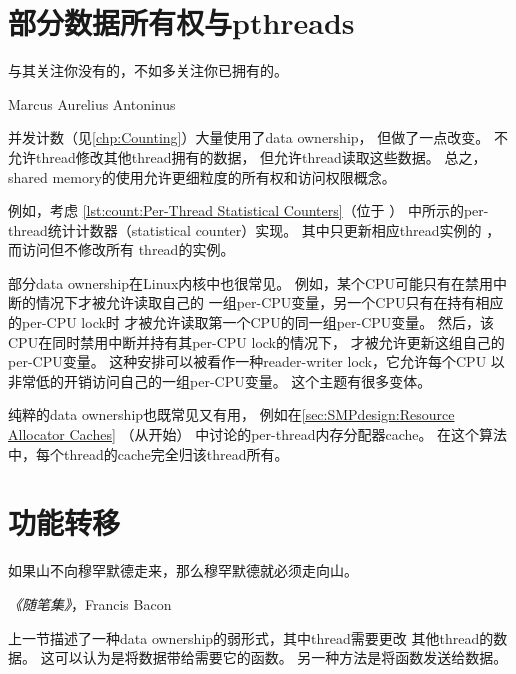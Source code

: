 \section{部分数据所有权与pthreads}
\label{sec:owned:Partial Data Ownership and pthreads}
%
\epigraph{与其关注你没有的，不如多关注你已拥有的。}
	 {Marcus Aurelius Antoninus}

并发计数（见\cref{chp:Counting}）大量使用了data ownership，
但做了一点改变。
不允许thread修改其他thread拥有的数据，
但允许thread读取这些数据。
总之，shared memory的使用允许更细粒度的所有权和访问权限概念。

例如，考虑
\cref{lst:count:Per-Thread Statistical Counters}（位于
）
中所示的per-thread统计计数器（statistical counter）实现。
其中只更新相应thread实例的
，
而访问但不修改所有
thread的实例。

\QuickQuizEnd

部分data ownership在Linux内核中也很常见。
例如，某个CPU可能只有在禁用中断的情况下才被允许读取自己的
一组per-CPU变量，另一个CPU只有在持有相应的per-CPU lock时
才被允许读取第一个CPU的同一组per-CPU变量。
然后，该CPU在同时禁用中断并持有其per-CPU lock的情况下，
才被允许更新这组自己的per-CPU变量。
这种安排可以被看作一种reader-writer lock，它允许每个CPU
以非常低的开销访问自己的一组per-CPU变量。
这个主题有很多变体。

纯粹的data ownership也既常见又有用，
例如在\cref{sec:SMPdesign:Resource Allocator Caches}
（从开始）
中讨论的per-thread内存分配器cache。
在这个算法中，每个thread的cache完全归该thread所有。

\section{功能转移}
\label{sec:owned:Function Shipping}
%
\epigraph{如果山不向穆罕默德走来，那么穆罕默德就必须走向山。}
	 {\emph{《随笔集》}，Francis Bacon}

上一节描述了一种data ownership的弱形式，其中thread需要更改
其他thread的数据。
这可以认为是将数据带给需要它的函数。
另一种方法是将函数发送给数据。

